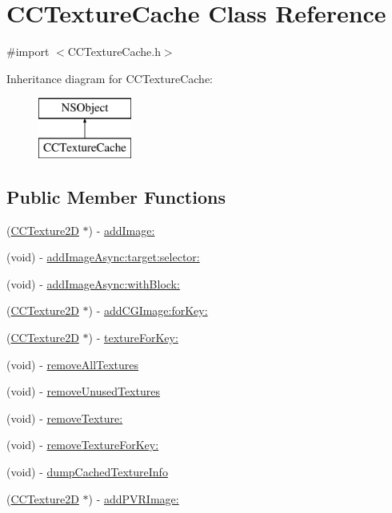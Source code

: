 \hypertarget{interface_c_c_texture_cache}{\section{C\-C\-Texture\-Cache Class Reference}
\label{interface_c_c_texture_cache}
}


{\ttfamily \#import $<$C\-C\-Texture\-Cache.\-h$>$}

Inheritance diagram for C\-C\-Texture\-Cache\-:\begin{figure}[H]
\begin{center}
\leavevmode
\includegraphics[height=2.000000cm]{interface_c_c_texture_cache}
\end{center}
\end{figure}
\subsection*{Public Member Functions}
\begin{DoxyCompactItemize}
\item 
(\hyperlink{class_c_c_texture2_d}{C\-C\-Texture2\-D} $\ast$) -\/ \hyperlink{interface_c_c_texture_cache_a76f5cb737d48b8046756b033b5da93cf}{add\-Image\-:}
\item 
(void) -\/ \hyperlink{interface_c_c_texture_cache_a19844e2980e63b366605eaa97239ba59}{add\-Image\-Async\-:target\-:selector\-:}
\item 
(void) -\/ \hyperlink{interface_c_c_texture_cache_a4d8bdd73c4dd06f5fd81a4908c279384}{add\-Image\-Async\-:with\-Block\-:}
\item 
(\hyperlink{class_c_c_texture2_d}{C\-C\-Texture2\-D} $\ast$) -\/ \hyperlink{interface_c_c_texture_cache_a921adee8faefcdb4aa8d248b8fe66692}{add\-C\-G\-Image\-:for\-Key\-:}
\item 
(\hyperlink{class_c_c_texture2_d}{C\-C\-Texture2\-D} $\ast$) -\/ \hyperlink{interface_c_c_texture_cache_a6ffdf7ce63a9e5c5b5b6d79d83eca27c}{texture\-For\-Key\-:}
\item 
(void) -\/ \hyperlink{interface_c_c_texture_cache_abebd44b405b4162c98504548c3691633}{remove\-All\-Textures}
\item 
(void) -\/ \hyperlink{interface_c_c_texture_cache_adb206694c1459a898f357d2dd3638f72}{remove\-Unused\-Textures}
\item 
(void) -\/ \hyperlink{interface_c_c_texture_cache_a6959884d084296e1e32efdcbb2457a25}{remove\-Texture\-:}
\item 
(void) -\/ \hyperlink{interface_c_c_texture_cache_aec3ada81d0420b798fde06c1a59334d6}{remove\-Texture\-For\-Key\-:}
\item 
(void) -\/ \hyperlink{interface_c_c_texture_cache_ae2b40ef270a73cdfe2398578240b553f}{dump\-Cached\-Texture\-Info}
\item 
(\hyperlink{class_c_c_texture2_d}{C\-C\-Texture2\-D} $\ast$) -\/ \hyperlink{interface_c_c_texture_cache_ac4a262017e54ad68035c213a02488cc0}{add\-P\-V\-R\-Image\-:}
\end{DoxyCompactItemize}

